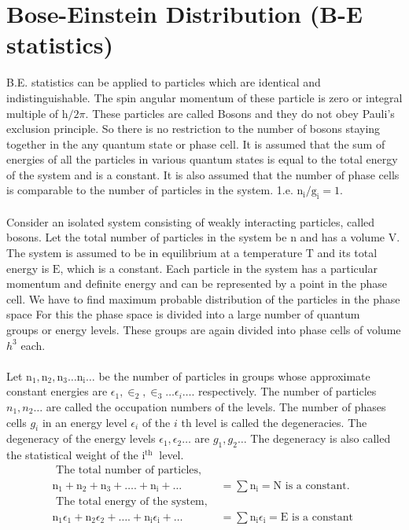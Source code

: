 \section{ Bose-Einstein Distribution (B-E statistics)}
 B.E. statistics can be applied to particles which are identical and indistinguishable. The spin angular momentum of these particle is zero or integral multiple of $\mathrm{h} / 2 \pi$. These particles are called Bosons and they do not obey Pauli's exclusion principle. So there is no restriction to the number of bosons staying together in the any quantum state or phase cell. It is assumed that the sum of energies of all the particles in various quantum states is equal to the total energy of the system and is a constant. It is also assumed that the number of phase cells is comparable to the number of particles in the system. 1.e. $\mathrm{n}_{\mathrm{i}} / \mathrm{g}_{\mathrm{i}}=1$.\\\\
 Consider an isolated system consisting of weakly interacting particles, called bosons. Let the total number of particles in the system be $\mathrm{n}$ and has a volume $\mathrm{V}$. The system is assumed to be in equilibrium at a temperature $\mathrm{T}$ and its total energy is $\mathrm{E}$, which is a constant. Each particle in the system has a particular momentum and definite energy and can be represented by a point in the phase cell. We have to find maximum probable distribution of the particles in the phase space For this the phase space is divided into a large number of quantum\\
 groups or energy levels. These groups are again divided into phase cells of volume $h^{3}$ each.\\\\
 Let $\mathrm{n}_{1}, \mathrm{n}_{2}, \mathrm{n}_{3} \ldots \mathrm{n}_{\mathrm{i}} \ldots$ be the number of particles in groups whose approximate constant energies are $\epsilon_{1}, \in_{2}, \in_{3} \ldots \epsilon_{i} \ldots .$ respectively. The number of particles $n_{1}, n_{2} \ldots$ are called the occupation numbers of the levels. The number of phases cells $g_{i}$ in an energy level $\epsilon_{i}$ of the $i$ th level is called the degeneracies. The degeneracy of the energy levels $\epsilon_{1}, \epsilon_{2} \ldots$ are $g_{1}, g_{2} \ldots$ The degeneracy is also called the statistical weight of the $\mathrm{i}^{\text {th }}$ level.
 \begin{align*}
 \text { The total number of particles, }\\
 \mathrm{n}_{1}+\mathrm{n}_{2}+\mathrm{n}_{3}+\ldots .+\mathrm{n}_{\mathrm{i}}+\ldots&=\sum \mathrm{n}_{\mathrm{i}}=\mathrm{N} \text { is a constant. }\\
 \text { The total energy of the system, }\\
 \mathrm{n}_{1} \epsilon_{1}+\mathrm{n}_{2} \epsilon_{2}+\ldots .+\mathrm{n}_{\mathrm{i}} \epsilon_{\mathrm{i}}+\ldots&=\sum \mathrm{n}_{\mathrm{i}} \epsilon_{\mathrm{i}}=\mathrm{E} \text { is a constant }
 \end{align*}
